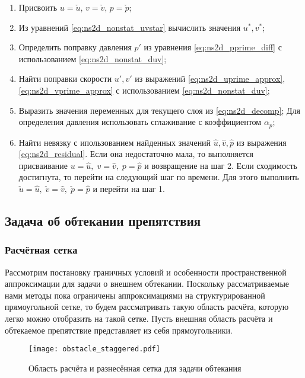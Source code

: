 \begin{enumerate}
\item Присвоить $u=\check u$, $v=\check v$, $p=\check p$;
\item Из уравнений \eqref{eq:ns2d_nonstat_uvstar}
      вычислить значения $u^*, v^*$;
\item Определить поправку давления $p'$ из уравнения \eqref{eq:ns2d_pprime_diff} с использованием \eqref{eq:ns2d_nonstat_duv};
\item Найти поправки скорости $u', v'$ из выражений \eqref{eq:ns2d_uprime_approx}, \eqref{eq:ns2d_vprime_approx} с использованием \eqref{eq:ns2d_nonstat_duv};
\item Выразить значения переменных для текущего слоя из \eqref{eq:ns2d_decomp};
      Для определения давления использовать сглаживание с коэффициентом $\alpha_p$;
\item Найти невязку с ипользованием найденных значений $\hat u, \hat v, \hat p$
      из выражения \eqref{eq:ns2d_residual}.
      Если она недостаточно мала, то выполняется присваивание
      $u = \hat u, \; v=\hat v, \; p = \hat p$ 
      и возвращение на шаг 2.
      Если сходимость достигнута, то перейти на следующий шаг по времени.
      Для этого выполнить
      $\check u = \hat u, \; \check v= \hat v, \; \check p = \hat p$ 
      и перейти на шаг 1.
\end{enumerate}

\subsection{Задача об обтекании препятствия}
\label{sec:problem-obstacle}

\subsubsection{Расчётная сетка}
Рассмотрим постановку граничных условий и особенности пространственной аппроксимации для задачи
о внешнем обтекании. Поскольку рассматриваемые нами методы
пока ограничены аппроксимациями на структурированной прямоугольной
сетке, то будем рассматривать такую область расчёта,
которую легко можно отобразить на такой сетке. Пусть внешняя
область расчёта и обтекаемое препятствие представляет из себя прямоугольники.

\begin{figure}[h!]
\centering
\texttt{[image: obstacle\_staggered.pdf]}
\caption{Область расчёта и разнесённая сетка для задачи обтекания}
\label{fig:obstacle_staggered}
\end{figure}

